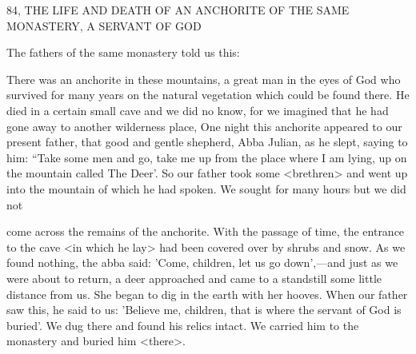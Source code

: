 84, THE LIFE AND DEATH OF AN ANCHORITE
OF THE SAME MONASTERY, A SERVANT OF GOD

The fathers of the same monastery told us this:

There was an anchorite in these mountains, a great man in the eyes
of God who survived for many years on the natural vegetation
which could be found there. He died in a certain small cave and we
did no know, for we imagined that he had gone away to another
wilderness place, One night this anchorite appeared to our present
father, that good and gentle shepherd, Abba Julian, as he slept,
saying to him: “Take some men and go, take me up from the place
where I am lying, up on the mountain called The Deer'. So our
father took some <brethren> and went up into the mountain of
which he had spoken. We sought for many hours but we did not

come across the remains of the anchorite. With the passage of time,
the entrance to the cave <in which he lay> had been covered over
by shrubs and snow. As we found nothing, the abba said: 'Come,
children, let us go down',—and just as we were about to return, a
deer approached and came to a standstill some little distance from
us. She began to dig in the earth with her hooves. When our father
saw this, he said to us: 'Believe me, children, that is where the
servant of God is buried'. We dug there and found his relics intact.
We carried him to the monastery and buried him <there>.

